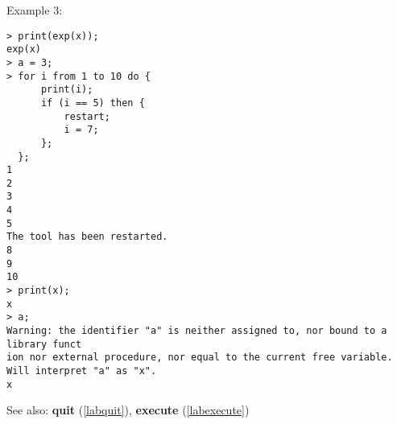 \noindent Example 3: 
\begin{center}\begin{minipage}{15cm}\begin{Verbatim}[frame=single,commandchars=\\\|\~]
> print(exp(x));
exp(x)
> a = 3;
> for i from 1 to 10 do {
      print(i);
      if (i == 5) then {
          restart;
          i = 7;
      };
  };
1
2
3
4
5
The tool has been restarted.
8
9
10
> print(x);
x
> a;
Warning: the identifier "a" is neither assigned to, nor bound to a library funct
ion nor external procedure, nor equal to the current free variable.
Will interpret "a" as "x".
x
\end{Verbatim}
\end{minipage}\end{center}
See also: \textbf{quit} (\ref{labquit}), \textbf{execute} (\ref{labexecute})
